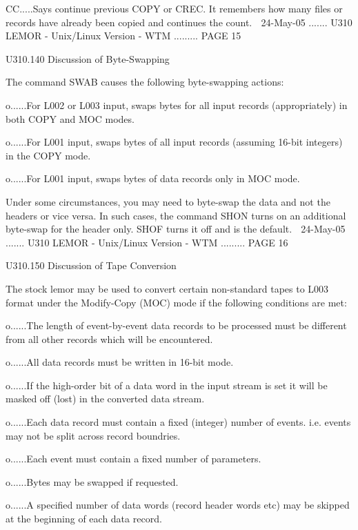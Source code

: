    CC.....Says continue previous COPY or CREC. It remembers how many files  or
          records have already been copied and continues the count.
    
   24-May-05 ....... U310  LEMOR - Unix/Linux Version - WTM ......... PAGE  15
 
 
   U310.140  Discussion of Byte-Swapping
 
   The command SWAB causes the following byte-swapping actions:
 
   o......For  L002  or  L003  input,  swaps  bytes  for  all  input   records
          (appropriately) in both COPY and MOC modes.
 
   o......For  L001  input,  swaps bytes of all input records (assuming 16-bit
          integers) in the COPY mode.
 
   o......For L001 input, swaps bytes of data records only in MOC mode.
 
   Under some circumstances, you may need to byte-swap the data  and  not  the
   headers  or  vice  versa.  In  such  cases,  the  command  SHON turns on an
   additional byte-swap for the header only. SHOF turns  it  off  and  is  the
   default.
    
   24-May-05 ....... U310  LEMOR - Unix/Linux Version - WTM ......... PAGE  16
 
 
   U310.150  Discussion of Tape Conversion
 
   The  stock  lemor may be used to convert certain non-standard tapes to L003
   format under the Modify-Copy (MOC) mode if  the  following  conditions  are
   met:
 
   o......The  length  of  event-by-event data records to be processed must be
          different from all other records which will be encountered.
 
   o......All data records must be written in 16-bit mode.
 
   o......If the high-order bit of a data word in the input stream is  set  it
          will be masked off (lost) in the converted data stream.
 
   o......Each  data  record  must contain a fixed (integer) number of events.
          i.e. events may not be split across record boundries.
 
   o......Each event must contain a fixed number of parameters.
 
   o......Bytes may be swapped if requested.
 
   o......A specified number of data words (record header words  etc)  may  be
          skipped at the beginning of each data record.
 
